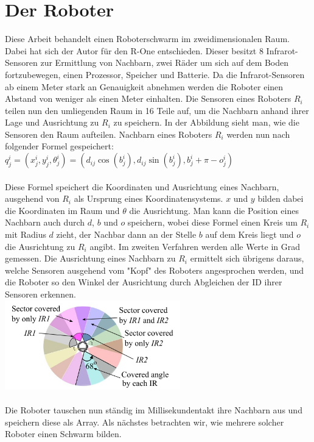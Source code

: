 \section{Der Roboter}

Diese Arbeit behandelt einen Roboterschwarm im zweidimensionalen Raum. Dabei hat sich der Autor für den 
R-One entschieden. Dieser besitzt 8 Infrarot-Sensoren zur Ermittlung von Nachbarn, zwei Räder um sich
auf dem Boden fortzubewegen, einen Prozessor, Speicher und Batterie. Da die Infrarot-Sensoren ab einem
Meter stark an Genauigkeit abnehmen werden die Roboter einen Abstand von weniger als einen Meter einhalten.
Die Sensoren eines Roboters $R_i$ teilen nun den umliegenden Raum in 16 Teile auf, um die Nachbarn anhand 
ihrer Lage und Ausrichtung zu $R_i$ zu speichern. In der Abbildung sieht man, wie die Sensoren den Raum
aufteilen. Nachbarn eines Roboters $R_i$ werden nun nach folgender Formel gespeichert:\\

$q_j^i=(x_j^i,y_j^i,\theta_j^i)=(d_{ij}\cos(b_j^i),d_{ij}\sin(b_j^i),b_j^i+\pi-o_j^i)$\\\\
Diese Formel speichert die Koordinaten und Ausrichtung eines Nachbarn, ausgehend von $R_i$ als Ursprung
eines Koordinatensystems. $x$ und $y$ bilden dabei die Koordinaten im Raum und $\theta$ die Ausrichtung.
Man kann die Position eines Nachbarn auch durch $d$, $b$ und $o$ speichern, wobei diese Formel einen Kreis
um $R_i$ mit Radius $d$ zieht, der Nachbar dann an der Stelle $b$ auf dem Kreis liegt und $o$ die
Ausrichtung zu $R_i$ angibt. Im zweiten Verfahren werden alle Werte in Grad gemessen. Die Ausrichtung eines
Nachbarn zu $R_i$ ermittelt sich übrigens daraus, welche Sensoren ausgehend vom "Kopf" des Roboters
angesprochen werden, und die Roboter so den Winkel der Ausrichtung durch Abgleichen der ID ihrer Sensoren
erkennen.\\

\includegraphics[width=3in]{images/Screenshot 2023-02-16 at 11.53.03 AM.png}\\\\
Die Roboter tauschen nun ständig im Millisekundentakt ihre Nachbarn aus und speichern diese als Array.
Als nächstes betrachten wir, wie mehrere solcher Roboter einen Schwarm bilden.